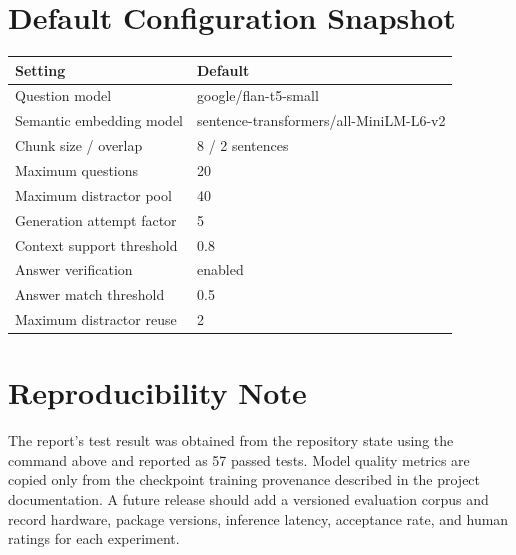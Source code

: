 \documentclass[12pt,a4paper]{report}
\begin{document}
\section{Default Configuration Snapshot}
\begin{longtable}{p{}p{}}
\toprule
\textbf{Setting} & \textbf{Default}\\
\midrule
Question model & google/flan-t5-small\\
Semantic embedding model & sentence-transformers/all-MiniLM-L6-v2\\
Chunk size / overlap & 8 / 2 sentences\\
Maximum questions & 20\\
Maximum distractor pool & 40\\
Generation attempt factor & 5\\
Context support threshold & 0.8\\
Answer verification & enabled\\
Answer match threshold & 0.5\\
Maximum distractor reuse & 2\\
\bottomrule
\end{longtable}

\section{Reproducibility Note}
The report's test result was obtained from the repository state using the command above and reported as 57 passed tests. Model quality metrics are copied only from the checkpoint training provenance described in the project documentation. A future release should add a versioned evaluation corpus and record hardware, package versions, inference latency, acceptance rate, and human ratings for each experiment.
\end{document}
